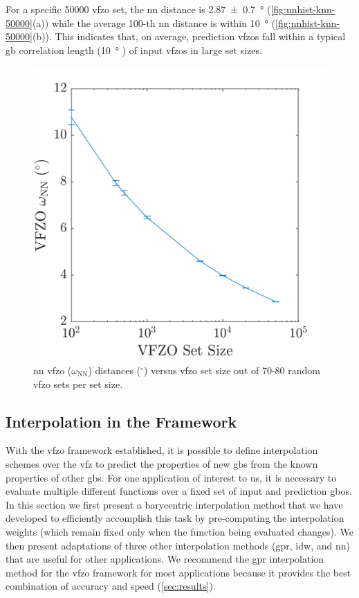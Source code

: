 \documentclass[final,twocolumn,12pt]{elsarticle}
\newcommand{\inpt}{input}
\newcommand{\outpt}{prediction}
\begin{document}
For a specific \num{50000} \gls{vfzo} set, the \gls{nn} distance is \SI{2.87 \pm 0.7}{\degree} (\cref{fig:nnhist-knn-50000}(a)) while the average 100-th \gls{nn} distance is within \SI{10}{\degree} (\cref{fig:nnhist-knn-50000}(b)). This indicates that, on average, \outpt{} \glspl{vfzo} fall within a typical \gls{gb} correlation length (\SI{10}{\degree} \cite{olmstedSurveyComputedGrain2009}) of \inpt{} \glspl{vfzo} in large set sizes.
\begin{figure}
    \centering
    \includegraphics[scale=1]{nndist-vs-setsize.png}
    \caption{\Gls{nn} \gls{vfzo} ($\omega_{\text{NN}}$) distances ($^{\circ}$) versus \gls{vfzo} set size out of 70-80 random \gls{vfzo} sets per set size.}
    \label{fig:nndist-vs-setsize}
\end{figure}

\subsection{Interpolation in the  Framework}
\label{sec:methods:interp}

With the \gls{vfzo} framework established, it is possible to define interpolation schemes over the \gls{vfz} to predict the properties of new \glspl{gb} from the known properties of other \glspl{gb}. For one application of interest to us, it is necessary to evaluate multiple different functions over a fixed set of \inpt{} and \outpt{} \glspl{gbo}. In this section we first present a barycentric interpolation method that we have developed to efficiently accomplish this task by pre-computing the interpolation weights (which remain fixed only when the function being evaluated changes). We then present adaptations of three other interpolation methods (\gls{gpr}, \gls{idw}, and \gls{nn}) that are useful for other applications. We recommend the \gls{gpr} interpolation method for the \gls{vfzo} framework for most applications because it provides the best combination of accuracy and speed (\cref{sec:results}).
\end{document}
